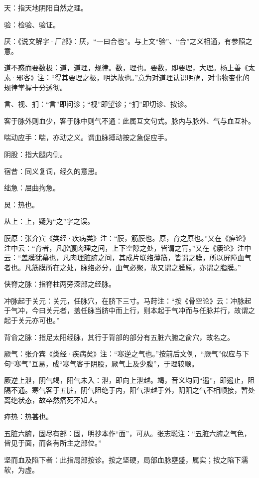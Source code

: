 \documentclass[draft,12pt]{ctexbook}
\begin{document}

\begin{jiaozhu}
	\item 天：指天地阴阳自然之理。
	\item 验：检验、验证。
	\item 厌：《说文解字·厂部》：厌，“一曰合也”。与上文“验”、“合”之义相通，有参照之意。
	\item 道不惑而要数极：道，道理，规律。数，理也。要数，即要理，大理。杨上善《太素·邪客》注：“得其要理之极，明达故也。”意为对道理认识明确，对事物变化的规律掌握十分透彻。
	\item 言、视、扪：“言”即问诊；“视”即望诊；“扪”即切诊、按诊。
	\item 客于脉外则血少，客于脉中则气不通：此属互文句式。脉内与脉外、气与血互补。
	\item 喘动应手：喘，亦动之义。谓血脉搏动按之急促应手。
	\item 阴股：指大腿内侧。
	\item 宿昔：同义复词，经久的意思。
	\item 绌急：屈曲拘急。
	\item 炅：热也。
	\item 从上：上，疑为“之”字之误。
	\item 膜原：张介宾《类经·疾病类》注：“膜，筋膜也。原，育之原也。”又在《痹论》注中云：“育者，凡腔腹肉理之间，上下空隙之处，皆谓之肓。”又在《瘘论》注中云：“盖膜犹幕也，凡肉理脏腑之间，其成片联络薄筋，皆谓之膜，所以屏障血气者也。凡筋膜所在之处，脉络必分，血气必聚，故又谓之膜原，亦谓之脂膜。”
	\item 侠脊之脉：指脊柱两旁深部之经脉。
	\item 冲脉起于关元：关元，任脉穴，在脐下三寸。马莳注：“按《骨空论》云：冲脉起于气冲，今曰关元者，盖任脉当脐中而上行，则本起于气冲而与任脉并行，故谓之起于关元亦可也。”
	\item 背俞之脉：指足太阳经脉，其行于背部的部分有五脏六腑之俞穴，故名之。
	\item 厥气：张介宾《类经·疾病矣》注：“寒逆之气也。”按前后文例，“厥气”似应与下句“寒气”互易，成“寒气客于阴股，厥气上及少腹”，于理较顺。
	\item 厥逆上泄，阴气竭，阳气未入：泄，即向上泄越。竭，音义均同“遏”，即遏止，阻隔不通。寒气客于五脏，阴气阻绝于内，阳气泄越于外，阴阳之气不相顺接，暂处离绝状态，故卒然痛死不知人。
	\item 瘅热：热甚也。
	\item 五脏六腑，固尽有部：固，明抄本作“面”，可从。张志聪注：“五脏六腑之气色，皆见于面，而各有所主之部位。”
	\item 坚而血及陷下者：此指局部按诊。按之坚硬，局部血脉壅盛，属实；按之陷下濡软，为虚。
\end{jiaozhu}
\end{document}
